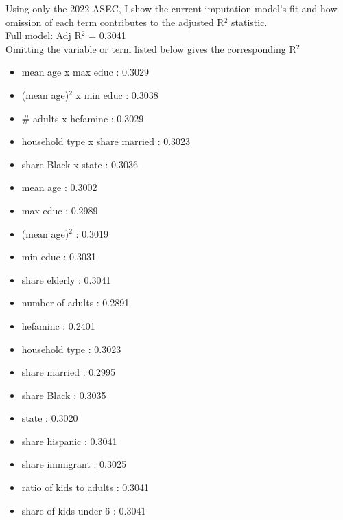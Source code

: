 \documentclass{article}
\begin{document}
	Using only the 2022 ASEC, I show the current imputation model's fit and how omission of each term contributes to the adjusted R$^2$ statistic. \\
	Full model:
	Adj R$^2$   =    0.3041 \\
	Omitting the variable or term listed below gives the corresponding R$^2$
	\begin{itemize}
		\item mean age x max educ :  0.3029
		\item (mean age)$^2$ x min educ : 0.3038
		\item \# adults x hefaminc : 0.3029
		\item household type x share married : 0.3023
		\item share Black x state : 0.3036
		\item mean age : 0.3002
		\item max educ : 0.2989
		\item (mean age)$^2$ : 0.3019
		\item min educ : 0.3031
		\item share elderly : 0.3041
		\item number of adults : 0.2891
		\item hefaminc : 0.2401
		\item household type : 0.3023
		\item share married : 0.2995
		\item share Black : 0.3035
		\item state : 0.3020
		\item share hispanic : 0.3041
		\item share immigrant : 0.3025
		\item ratio of kids to adults : 0.3041
		\item share of kids under 6 : 0.3041
	\end{itemize}

	
\end{document}

